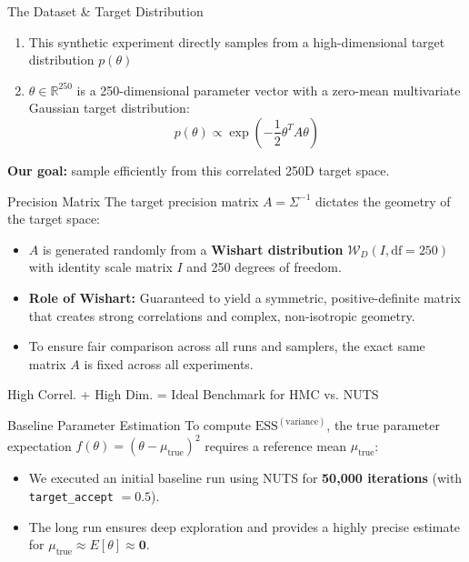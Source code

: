 \documentclass[aspectratio=43]{beamer}
\begin{document}
\begin{frame}{The Dataset \& Target Distribution}
	\begin{enumerate}
		\item This synthetic experiment directly samples from a high-dimensional target distribution $p(\theta)$
		\item $\theta \in \mathbb{R}^{250}$ is a 250-dimensional parameter vector with a zero-mean multivariate Gaussian target distribution:
		\[
		p(\theta) \propto \exp\left( -\frac{1}{2} \theta^T A \theta \right)
		\]
	\end{enumerate}
	
	\begin{center}
		\textbf{Our goal:} sample efficiently from this correlated 250D target space.
	\end{center}
\end{frame}


\begin{frame}{Precision Matrix}
	The target precision matrix $A = \Sigma^{-1}$ dictates the geometry of the target space:
	
	\begin{itemize}
		\item $A$ is generated randomly from a \textbf{Wishart distribution} $\mathcal{W}_D(I, \text{df}=250)$ with identity scale matrix $I$ and 250 degrees of freedom.
		\item \textbf{Role of Wishart:} Guaranteed to yield a symmetric, positive-definite matrix that creates strong correlations and complex, non-isotropic geometry.
		\item To ensure fair comparison across all runs and samplers, the exact same matrix $A$ is fixed across all experiments.
	\end{itemize}
	
	\vspace{0.5em}
	
	\begin{center}
		\alert{High Correl. + High Dim. = Ideal Benchmark for HMC vs. NUTS}
	\end{center}
\end{frame}

\begin{frame}{Baseline Parameter Estimation}
	To compute $\text{ESS}^{(\text{variance})}$, the true parameter expectation $f(\theta) = (\theta - \mu_{\text{true}})^2$ requires a reference mean $\mu_{\text{true}}$:
	
	\begin{itemize}
		\item We executed an initial baseline run using NUTS for \textbf{50,000 iterations} (with \texttt{target\_accept} $= 0.5$).
		\item The long run ensures deep exploration and provides a highly precise estimate for $\mu_{\text{true}} \approx E[\theta] \approx \mathbf{0}$.
	\end{itemize}
\end{frame}
\end{document}
